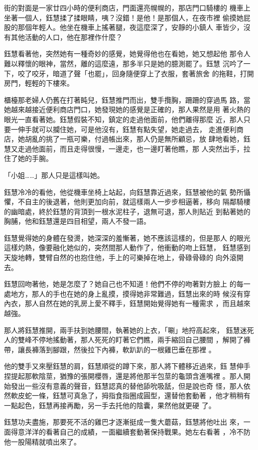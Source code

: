 街的對面是一家廿四小時的便利商店，門面還亮幌幌的，那店門口騎樓的
機車上坐著一個人，鈺慧揉了揉眼睛，咦？沒錯！是他！是那個人，在夜市裡
偷摸她屁股的那個年輕人。他坐在機車上搖著腿，夜這麼深了，安靜的小鎮人
車皆少，沒有其他活動的人口，他在那裡作什麼？

鈺慧看著他，突然她有一種奇妙的感覺，她覺得他也在看她，她又想起他
那令人難以釋懷的眼神，當然，離的這麼遠，那多半只是她的臆測罷了。鈺慧
沉吟了一下，咬了咬牙，暗道了聲「也罷」，回身隨便穿上了衣服，套著旅舍
的拖鞋，打開房門，輕輕的下樓來。

櫃檯那老婦人仍舊在打著盹兒，鈺慧推門而出，雙手攬胸，跚跚的穿過馬
路，當她越來越接近便利商店門口，她發現她的感覺是正確的，那人果然是用
著火熱的眼光一直看著她。鈺慧假裝不知，鎮定的走過他面前，他們離得那麼
近，那人只要一伸手就可以攔住她，可是他沒有，鈺慧有點失望，她走過去，
走進便利商店，她胡亂的挑了一瓶可樂，付過帳出來，那人仍是無所顧忌，放
肆地看她，鈺慧又走過他面前，而且走得很慢，一邊走，也一邊盯著他瞧，那
人突然出手，拉住了她的手腕。

「小姐……」那人只是這樣叫她。

鈺慧冷冷的看他，他從機車坐椅上站起，向鈺慧靠近過來，鈺慧被他的氣
勢所懾懼，不自主的後退著，他則更加向前，就這樣兩人一步步相逼著，移向
隔鄰騎樓的幽暗處，終於鈺慧的背頂到一根水泥柱子，退無可退，那人則貼近
到黏著她的胸脯，他和鈺慧還是四目相望，兩人不發一語。

鈺慧覺得她的身體在發燙，她深深的羞慚著，她不應該這樣的，但是那人
的眼光這樣灼熱，像要融化她似的，突然間那人動作了，他衝動的吻上鈺慧，
鈺慧感到天旋地轉，雙臂自然的也抱住他，手上的可樂掉在地上，骨碌骨碌的
向外滾開去。

鈺慧回吻著他，她是怎麼了？她自己也不知道！他們不停的吻著對方臉上
的每一處地方，那人的手也在她的身上亂摸，摸得她非常難過，鈺慧出來的時
候沒有穿內衣，那人自然在她的乳房上愛不釋手，鈺慧開始覺得她有一種需求
，而且越來越強。

那人將鈺慧推開，兩手扶到她腰間，執著她的上衣，「唰」地捋高起來，
鈺慧迷死人的雙峰不停地搖動著，那人死死的盯著它們瞧，兩手縮回自己腰間
，解開了褲帶，讓長褲落到腳跟，然後拉下內褲，軟趴趴的一根雞巴垂在那裡
。

他的雙手又來壓鈺慧的肩，鈺慧順從的蹲下來，那人將下體移近過來，鈺
慧伸手捏提起那軟陰莖，猶豫的張開櫻唇，還是將他那半包莖的龜頭含進嘴裡
。那人開始發出一些沒有意義的聲音，鈺慧認真的替他舔吮吸舐，但是說也奇
怪，那人依然軟皮蛇一條，鈺慧可真急了，拇指食指圈成圓型，還替他套動著
，他才稍稍有一點起色，鈺慧再接再勵，另一手去托他的陰囊，果然他就更硬
了。

鈺慧功夫盡施，那要死不活的雞巴才逐漸挺成一隻大蘑菇，鈺慧將他吐出
來，一面得意洋洋的看著自己的成績，一面繼續套動著保持戰果。她左右看著
，冷不防他一股陽精就噴出來了。

